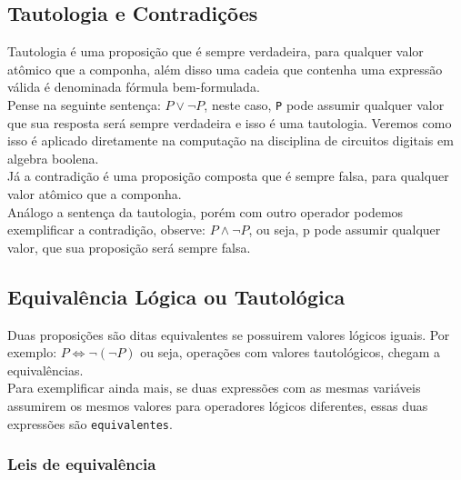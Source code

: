 \documentclass[12pt, onecolumn]{article}
\begin{document}
	\subsection{\centering Tautologia e Contradições}
	
	Tautologia é uma proposição que é sempre verdadeira, para qualquer valor
	atômico que a componha, além disso uma cadeia que contenha uma expressão
	válida é denominada fórmula bem-formulada. \\
	\newline
	Pense na seguinte sentença: $P \lor \lnot P$, neste caso, \texttt{P}
	pode assumir qualquer valor que sua resposta será sempre verdadeira e
	isso é uma tautologia. Veremos como isso é aplicado diretamente na
	computação na disciplina de circuitos digitais em algebra boolena.\\
	\newline
	Já a contradição é uma proposição composta que é sempre falsa, para
	qualquer valor atômico que a componha.\\
	\newline
	Análogo a sentença da tautologia, porém com outro operador podemos
	exemplificar a contradição, observe: $P \land \lnot P$, ou seja, 
	p pode assumir qualquer valor, que sua proposição será sempre falsa.
	
	\subsection{\centering Equivalência Lógica ou Tautológica}

	Duas proposições são ditas equivalentes se possuirem valores lógicos iguais.
	Por exemplo: $P \Leftrightarrow \lnot(\lnot P)$ ou seja, operações
	com valores tautológicos, chegam a equivalências.\\
	\newline
	Para exemplificar ainda mais, se duas expressões com as mesmas variáveis
	assumirem os mesmos valores para operadores lógicos diferentes, essas duas
	expressões são \texttt{equivalentes}. 

	\subsubsection{\centering Leis de equivalência}
	
\end{document}
